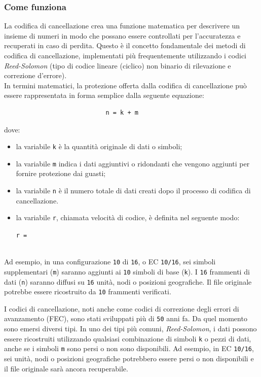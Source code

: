 \subsubsection{Come funziona}
La codifica di cancellazione crea una funzione matematica per descrivere un insieme di numeri in modo che possano essere controllati per l'accuratezza e recuperati in caso di perdita. Questo \`{e} il concetto fondamentale dei metodi di codifica di cancellazione, implementati pi\`{u} frequentemente utilizzando i codici \textit{Reed-Solomon} (tipo di codice lineare (ciclico) non binario di rilevazione e correzione d'errore)\cite{etichetta11}.\\
In termini matematici, la protezione offerta dalla codifica di cancellazione pu\`{o} essere rappresentata in forma semplice dalla seguente equazione:  
\begin{verbatim}
                       		n = k + m
\end{verbatim}
dove:
\begin{itemize}
\item 
la variabile \verb"k" \`{e} la quantit\`{a} originale di dati o simboli; 
\item
la variabile \verb"m" indica i dati aggiuntivi o ridondanti che vengono aggiunti per fornire protezione dai guasti;
\item
la variabile \verb"n" \`{e} il numero totale di dati creati dopo il processo di codifica di cancellazione\cite{etichetta11}.
\item
la variabile \verb"r", chiamata velocit\`{a} di codice, \`{e} definita nel seguente modo: \\
\begin{center}
						\verb"r = "\\

\end{center}                       		
\end{itemize}
\\
Ad esempio, in una configurazione \verb"10" di \verb"16", o EC \verb"10/16", sei simboli supplementari (\verb"m") saranno aggiunti ai \verb"10" simboli di base (\verb"k"). I \verb"16" frammenti di dati (\verb"n") saranno diffusi su \verb"16" unit\`{a}, nodi o posizioni geografiche. Il file originale potrebbe essere ricostruito da \verb"10" frammenti verificati\cite{etichetta11}.

I codici di cancellazione, noti anche come codici di correzione degli errori di avanzamento (FEC), sono stati sviluppati pi\`{u} di \verb"50" anni fa. Da quel momento sono emersi diversi tipi. In uno dei tipi pi\`{u} comuni, \textit{Reed-Solomon}, i dati possono essere ricostruiti utilizzando qualsiasi combinazione di simboli \verb"k" o pezzi di dati, anche se i simboli \verb"m" sono persi o non sono disponibili. Ad esempio, in EC \verb"10/16", sei unit\`{a}, nodi o posizioni geografiche potrebbero essere persi o non disponibili e il file originale sar\`{a} ancora recuperabile\cite{etichetta11}.
 
